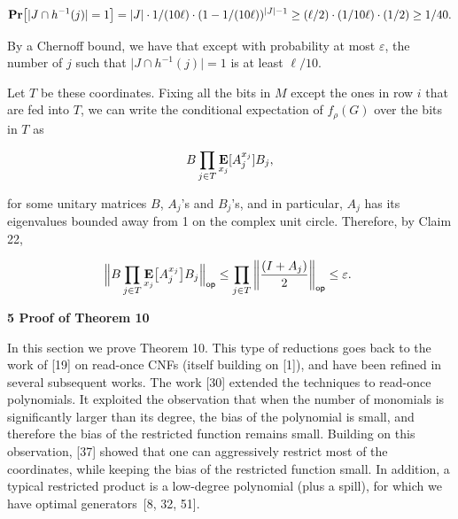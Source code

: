\documentclass[10pt,a4paper]{article}
\begin{document}
\[\begin{gathered}
\mathop{\bf Pr\/}\bigl{[}\lvert J\cap h^{-1}(j)\rvert=1\bigr{]}=\lvert J\rvert\cdot 1/(10\ell)\cdot(1-1/(10\ell))^{\lvert J\rvert-1}\geq(\ell/2)\cdot(1/10\ell)\cdot(1/2)\geq 1/40.
\end{gathered}\]


By a Chernoff bound, we have that except with probability at most $\varepsilon$, the number of $j$ such that $\lvert J\cap h^{-1}(j)\rvert=1$ is at least $\ell/10$.\par




Let $T$ be these coordinates.
Fixing all the bits in $M$ except the ones in row $i$ that are fed into $T$, we can write the conditional expectation of $f_{\rho}(G)$ over the bits in $T$ as\par


\[\begin{gathered}
B\prod_{j\in T}\mathop{\bf E\/}_{x_{j}}[A_{j}^{x_{j}}]B_{j},
\end{gathered}\]


for some unitary matrices $B$, $A_{j}$’s and $B_{j}$’s, and in particular, $A_{j}$ has its eigenvalues bounded away from 1 on the complex unit circle.
Therefore, by Claim 22,\par


\[\begin{gathered}
\Big{\lVert}B\prod_{j\in T}\mathop{\bf E\/}_{x_{j}}\bigl{[}A_{j}^{x_{j}}\bigr{]}B_{j}\Big{\rVert}_{\mathsf{op}}\leq\prod_{j\in T}\bigg{\lVert}\frac{(I+A_{j})}{2}\bigg{\rVert}_{\mathsf{op}}\leq\varepsilon.\
\end{gathered}\]






\par\medskip\noindent\textbf{
5 Proof of Theorem 10
}\par




In this section we prove Theorem 10. This type of reductions goes back to the work of [19] on read-once CNFs (itself building on [1]), and have been refined in several subsequent works. The work [30] extended the techniques to read-once polynomials. It exploited the observation that when the number of monomials is significantly larger than its degree, the bias of the polynomial is small, and therefore the bias of the restricted function remains small.
Building on this observation, [37] showed that one can aggressively restrict most of the coordinates, while keeping the bias of the restricted function small.
In addition, a typical restricted product is a low-degree polynomial (plus a spill), for which we have optimal generators [8, 32, 51].\par
\end{document}
